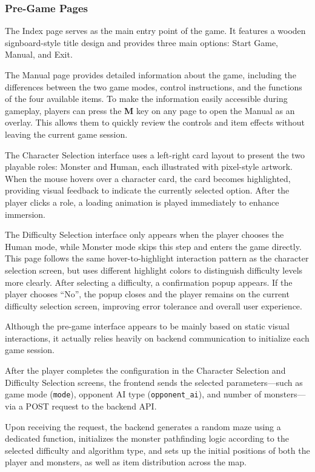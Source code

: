 \subsubsection{Pre-Game Pages}

The Index page serves as the main entry point of the game. It features a wooden signboard-style title design and provides three main options: Start Game, Manual, and Exit.

The Manual page provides detailed information about the game, including the differences between the two game modes, control instructions, and the functions of the four available items. To make the information easily accessible during gameplay, players can press the \textbf{M} key on any page to open the Manual as an overlay. This allows them to quickly review the controls and item effects without leaving the current game session.

The Character Selection interface uses a left-right card layout to present the two playable roles: Monster and Human, each illustrated with pixel-style artwork. When the mouse hovers over a character card, the card becomes highlighted, providing visual feedback to indicate the currently selected option. After the player clicks a role, a loading animation is played immediately to enhance immersion.

The Difficulty Selection interface only appears when the player chooses the Human mode, while Monster mode skips this step and enters the game directly. This page follows the same hover-to-highlight interaction pattern as the character selection screen, but uses different highlight colors to distinguish difficulty levels more clearly. After selecting a difficulty, a confirmation popup appears. If the player chooses ``No'', the popup closes and the player remains on the current difficulty selection screen, improving error tolerance and overall user experience.

Although the pre-game interface appears to be mainly based on static visual interactions, it actually relies heavily on backend communication to initialize each game session.

After the player completes the configuration in the Character Selection and Difficulty Selection screens, the frontend sends the selected parameters---such as game mode (\texttt{mode}), opponent AI type (\texttt{opponent\_ai}), and number of monsters---via a POST request to the backend API.

Upon receiving the request, the backend generates a random maze using a dedicated function, initializes the monster pathfinding logic according to the selected difficulty and algorithm type, and sets up the initial positions of both the player and monsters, as well as item distribution across the map.

